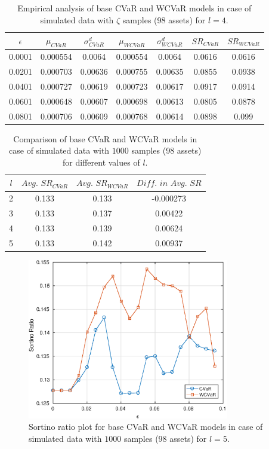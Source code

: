 \documentclass[12pt]{article}
\numberwithin{equation}{section}
\begin{document}
\begin{table}[!h]
\centering
\captionsetup{justification=centering}
\begin{tabular}{||c|c|c|c|c|c|c||}
\hline
$\epsilon$ & $\mu_{CVaR}$ & $\sigma_{CVaR}^{d}$ & $\mu_{WCVaR}$ & $\sigma_{WCVaR}^{d}$ & $SR_{CVaR}$ & $SR_{WCVaR}$\\
\hline
0.0001 & 0.000554 & 0.0064 & 0.000554 & 0.0064 & 0.0616 & 0.0616 \\
0.0201 & 0.000703 & 0.00636 & 0.000755 & 0.00635 & 0.0855 & 0.0938 \\
0.0401 & 0.000727 & 0.00619 & 0.000723 & 0.00617 & 0.0917 & 0.0914 \\
0.0601 & 0.000648 & 0.00607 & 0.000698 & 0.00613 & 0.0805 & 0.0878 \\
0.0801 & 0.000706 & 0.00609 & 0.000768 & 0.00614 & 0.0898 & 0.099 \\
\hline
\end{tabular}
\caption{Empirical analysis of base CVaR and WCVaR models in case of simulated data with $\zeta$ samples (98 assets) for $l=4$.}
\label{tab:6.5}
\end{table}

\begin{table}[!h]
\centering
\captionsetup{justification=centering}
\begin{tabular}{||c|c|c|c||}
\hline
$l$ & $Avg. \, \, SR_{CVaR}$ & $Avg. \, \, SR_{WCVaR}$ & $Diff. \, \, in \, \, Avg. \, \, SR$ \\
\hline
2 & 0.133 & 0.133 & -0.000273 \\
3 & 0.133 & 0.137 & 0.00422 \\
4 & 0.133 & 0.139 & 0.00624 \\
5 & 0.133 & 0.142 & 0.00937 \\
\hline
\end{tabular}
\caption{Comparison of base CVaR and WCVaR models in case of simulated data with $1000$ samples (98 assets) for different values of $l$.}
\label{avgtab:6.6}
\end{table}

\begin{figure}[!h]
\centering
\includegraphics[height=7.0cm]{cvar_100s_1000_5.eps}
\caption{Sortino ratio plot for base CVaR and WCVaR models in case of simulated data with $1000$ samples (98 assets) for $l=5$.}
\label{fig:6.6}
\end{figure}
\end{document}
